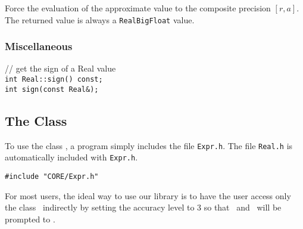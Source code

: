 Force the evaluation of the approximate value to the composite 
precision $[r, a]$. The returned value is always a {\tt RealBigFloat}
value.

\subsubsection{Miscellaneous}
\begin{progb} {
\> // get the sign of a Real value\\
\> \tt  int Real::sign() const;\\
\> \tt  int sign(const Real\&);
}\end{progb}

\subsection{The Class \expr}

To use the class \expr, a program simply includes the file
{\tt Expr.h}. The file {\tt Real.h} is automatically included 
with {\tt Expr.h}.

\nopagebreak
\begin{progb}{
\> \tt \#include "CORE/Expr.h"
}\end{progb}

For most users,
the ideal way to use our library is to have the user
access only the class \expr\ indirectly by setting the accuracy level
to 3 so that \double\ and \lng\ will be prompted to \expr.

